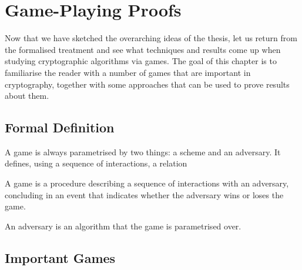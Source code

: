 \chapter{Game-Playing Proofs}

Now that we have sketched the overarching ideas of the thesis, let us return from the formalised treatment and see what
techniques and results come up when studying cryptographic algorithms via games.  The goal of this chapter is to
familiarise the reader with a number of games that are important in cryptography, together with some approaches that can
be used to prove results about them.


\section{Formal Definition}

A game is always parametrised by two things: a scheme and an adversary.  It defines, using a sequence of interactions, a
relation 

A game is a procedure describing a sequence of interactions with an adversary, concluding in an event that indicates
whether the adversary wins or loses the game.

An adversary is an algorithm that the game is parametrised over.



\section{Important Games}


